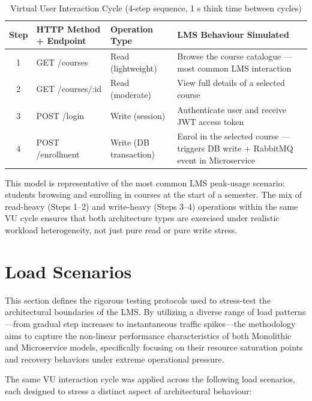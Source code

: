 \begin{table}[h!]
    \centering
    \caption{Virtual User Interaction Cycle (4-step sequence, 1 s think time between cycles)}
    \label{tab:user-cycle}
    \small
    \renewcommand{\arraystretch}{1.2}
    \begin{tabularx}{\textwidth}{c l l X}
        \toprule
        \textbf{Step} & \textbf{HTTP Method + Endpoint} & \textbf{Operation Type} & \textbf{LMS Behaviour Simulated} \\
        \midrule
        1 & GET /courses & Read (lightweight) & Browse the course catalogue — most common LMS interaction \\
        2 & GET /courses/:id & Read (moderate) & View full details of a selected course \\
        3 & POST /login & Write (session) & Authenticate user and receive JWT access token \\
        4 & POST /enrollment & Write (DB transaction) & Enrol in the selected course — triggers DB write + RabbitMQ event in Microservice \\
        \bottomrule
    \end{tabularx}
\end{table}

This model is representative of the most common LMS peak-usage scenario: students browsing and enrolling 
in courses at the start of a semester. The mix of read-heavy (Steps 1–2) and write-heavy (Steps 3–4)
 operations within the same VU cycle ensures that both architecture types are exercised under realistic 
 workload heterogeneity, not just pure read or pure write stress.


\section{Load Scenarios}
This section defines the rigorous testing protocols used to stress-test the architectural boundaries of the LMS. By utilizing a diverse range of load patterns—from gradual step increases to instantaneous traffic spikes—the methodology aims to capture the non-linear performance characteristics of both Monolithic and Microservice models, specifically focusing on their resource saturation points and recovery behaviors under extreme operational pressure.

The same VU interaction cycle was applied across the following load scenarios, each designed to stress a 
distinct aspect of architectural behaviour:

